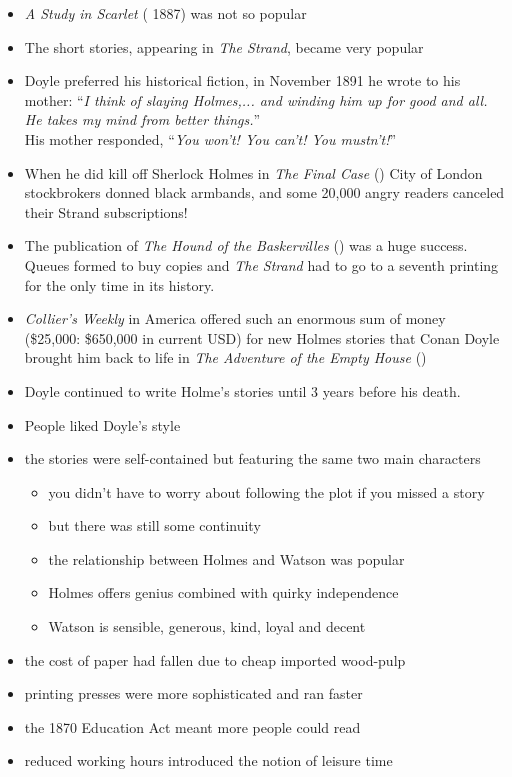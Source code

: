 \documentclass[a4paper,landscape,headrule,footrule,xetex]{foils}
\begin{document}
\begin{itemize}\addtolength{\itemsep}{-1.8ex}
\item \textit{A Study in Scarlet} ( 1887) was not so popular
\item The short stories, appearing in \textit{The Strand}, became very popular
\item Doyle preferred his historical fiction, in November 1891 he wrote to his mother: ``\textit{I think of slaying Holmes,... and winding him up for good and all. He takes my mind from better things.}'' %
 \\ His mother responded, ``\textit{You won't! You can't! You mustn't!}''
\item When he did kill off Sherlock Holmes in \textit{The Final Case}
  () City of London stockbrokers donned black armbands, and
  some 20,000 angry readers canceled their Strand subscriptions!
\item The publication of \textit{The Hound of the Baskervilles}
  () was a huge success. Queues formed to buy copies and
  \textit{The Strand} had to go to a seventh printing for the only
  time in its history.
\item \textit{Collier's Weekly} in America offered such an enormous
  sum of money (\$25,000: \$650,000 in current USD) for new Holmes
  stories that Conan Doyle brought him back to life in \textit{The
    Adventure of the Empty House} ()
\item Doyle continued to write Holme's stories until 3 years before his death.
\end{itemize}

\begin{itemize} \addtolength{\itemsep}{-1ex}
\item People liked Doyle's style
\item the stories were self-contained but featuring the same two main
  characters 
  \begin{itemize}
  \item you didn't have to worry about following the plot if you
    missed a story
  \item but there was still some continuity
  \item the relationship between Holmes and Watson was popular
  \item Holmes offers genius combined with quirky independence
  \item Watson is sensible, generous, kind, loyal and decent
  \end{itemize}
\item the cost of paper had fallen due to cheap imported wood-pulp
\item  printing presses were more  sophisticated and ran faster
\item the 1870 Education Act meant more people could read
\item reduced working hours introduced the notion of leisure time
\end{itemize}
\end{document}
